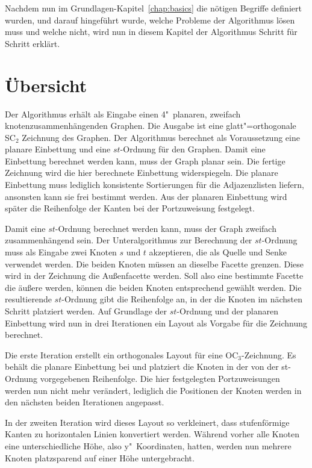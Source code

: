 \documentclass[a4paper]{scrreprt}
\theoremstyle{definition}
\begin{document}
Nachdem nun im Grundlagen-Kapitel~\ref{chap:basics} die nötigen Begriffe definiert wurden, und darauf hingeführt wurde, welche Probleme der Algorithmus lösen muss und welche nicht, wird nun in diesem Kapitel der Algorithmus Schritt für Schritt erklärt.

\section{Übersicht}

Der Algorithmus erhält als Eingabe einen 4"~planaren, zweifach knotenzusammenhängenden Graphen. Die Ausgabe ist eine glatt"=orthogonale SC$_2$ Zeichnung des Graphen. Der Algorithmus berechnet als Voraussetzung eine planare Einbettung und eine $st$-Ordnung für den Graphen. Damit eine Einbettung berechnet werden kann, muss der Graph planar sein. Die fertige Zeichnung wird die hier berechnete Einbettung widerspiegeln. Die planare Einbettung muss lediglich konsistente Sortierungen für die Adjazenzlisten liefern, ansonsten kann sie frei bestimmt werden. Aus der planaren Einbettung wird später die Reihenfolge der Kanten bei der Portzuweisung festgelegt.

Damit eine $st$-Ordnung berechnet werden kann, muss der Graph zweifach zusammenhängend sein. Der Unteralgorithmus zur Berechnung der $st$-Ordnung muss als Eingabe zwei Knoten $s$ und $t$ akzeptieren, die als Quelle und Senke verwendet werden. Die beiden Knoten müssen an dieselbe Facette grenzen. Diese wird in der Zeichnung die Außenfacette werden. Soll also eine bestimmte Facette die äußere werden, können die beiden Knoten entsprechend gewählt werden. Die resultierende $st$-Ordnung gibt die Reihenfolge an, in der die Knoten im nächsten Schritt platziert werden. Auf Grundlage der $st$-Ordnung und der planaren Einbettung wird nun in drei Iterationen ein Layout als Vorgabe für die Zeichnung berechnet. 

Die erste Iteration erstellt ein orthogonales Layout für eine OC$_3$-Zeichnung. Es behält die planare Einbettung bei und platziert die Knoten in der von der st-Ordnung vorgegebenen Reihenfolge. Die hier festgelegten Portzuweisungen werden nun nicht mehr verändert, lediglich die Positionen der Knoten werden in den nächsten beiden Iterationen angepasst.

In der zweiten Iteration wird dieses Layout so verkleinert, dass stufenförmige Kanten zu horizontalen Linien konvertiert werden. Während vorher alle Knoten eine unterschiedliche Höhe, also y"~Koordinaten, hatten, werden nun mehrere Knoten platzsparend auf einer Höhe untergebracht.
\end{document}
